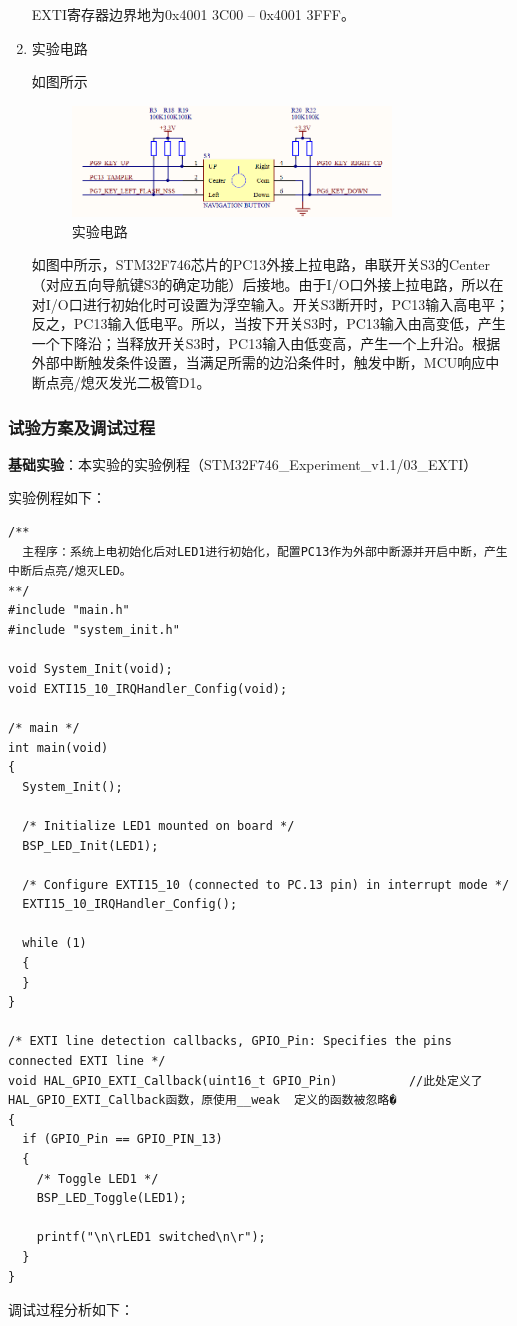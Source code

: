 ﻿\documentclass[UTF8,12pt]{article}
\begin{document}
\begin{enumerate}
  EXTI寄存器边界地为0x4001 3C00 – 0x4001 3FFF。

  \item 实验电路
  
  如图所示

  \begin{figure}[htbp]
    \centering
    \includegraphics[width=0.8\textwidth]{imgs/11.png}
    \caption{实验电路}
  \end{figure}

  如图中所示，STM32F746芯片的PC13外接上拉电路，串联开关S3的Center（对应五向导航键S3的确定功能）后接地。由于I/O口外接上拉电路，所以在对I/O口进行初始化时可设置为浮空输入。开关S3断开时，PC13输入高电平；反之，PC13输入低电平。所以，当按下开关S3时，PC13输入由高变低，产生一个下降沿；当释放开关S3时，PC13输入由低变高，产生一个上升沿。根据外部中断触发条件设置，当满足所需的边沿条件时，触发中断，MCU响应中断点亮/熄灭发光二极管D1。
\end{enumerate}

\subsubsection{试验方案及调试过程}
\noindent
\textbf{基础实验}：本实验的实验例程（STM32F746\_Experiment\_v1.1/03\_EXTI）

实验例程如下：

\begin{lstlisting}[frame=shadowbox]
/**
  主程序：系统上电初始化后对LED1进行初始化，配置PC13作为外部中断源并开启中断，产生中断后点亮/熄灭LED。
**/
#include "main.h"
#include "system_init.h"

void System_Init(void);
void EXTI15_10_IRQHandler_Config(void);

/* main */
int main(void)
{
  System_Init();
  
  /* Initialize LED1 mounted on board */
  BSP_LED_Init(LED1);
  
  /* Configure EXTI15_10 (connected to PC.13 pin) in interrupt mode */
  EXTI15_10_IRQHandler_Config();
  
  while (1)
  {
  }
}

/* EXTI line detection callbacks, GPIO_Pin: Specifies the pins connected EXTI line */
void HAL_GPIO_EXTI_Callback(uint16_t GPIO_Pin)			//此处定义了HAL_GPIO_EXTI_Callback函数，原使用__weak  定义的函数被忽略�
{
  if (GPIO_Pin == GPIO_PIN_13)
  {
    /* Toggle LED1 */
    BSP_LED_Toggle(LED1);
    
    printf("\n\rLED1 switched\n\r");
  }
}
\end{lstlisting}
调试过程分析如下：
\end{document}

